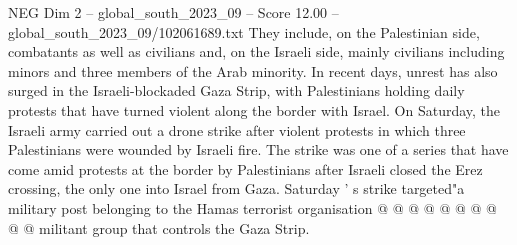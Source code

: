 \begin{textsample}{NEG Dim 2 – global\_south\_2023\_09 – Score 12.00 – global\_south\_2023\_09/102061689.txt}
They include, on the Palestinian side, combatants as well as civilians and, on the Israeli side, mainly civilians including minors and three members of the Arab minority.
In recent days, unrest has also surged in the Israeli-blockaded Gaza Strip, with Palestinians holding daily protests that have turned violent along the border with Israel.
On Saturday, the Israeli army carried out a drone strike after violent protests in which three Palestinians were wounded by Israeli fire.
The strike was one of a series that have come amid protests at the border by Palestinians after Israeli closed the Erez crossing, the only one into Israel from Gaza.
Saturday ' s strike targeted"a military post belonging to the Hamas terrorist organisation @ @ @ @ @ @ @ @ @ @ militant group that controls the Gaza Strip.

\end{textsample}
